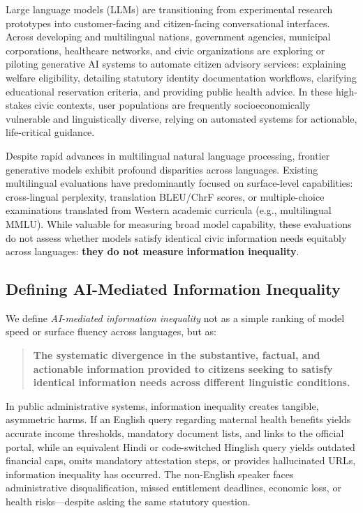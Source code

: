 \documentclass[11pt,a4paper]{article}
\begin{document}
Large language models (LLMs) are transitioning from experimental research prototypes into customer-facing and citizen-facing conversational interfaces. Across developing and multilingual nations, government agencies, municipal corporations, healthcare networks, and civic organizations are exploring or piloting generative AI systems to automate citizen advisory services: explaining welfare eligibility, detailing statutory identity documentation workflows, clarifying educational reservation criteria, and providing public health advice. In these high-stakes civic contexts, user populations are frequently socioeconomically vulnerable and linguistically diverse, relying on automated systems for actionable, life-critical guidance.

Despite rapid advances in multilingual natural language processing, frontier generative models exhibit profound disparities across languages. Existing multilingual evaluations have predominantly focused on surface-level capabilities: cross-lingual perplexity, translation BLEU/ChrF scores, or multiple-choice examinations translated from Western academic curricula (e.g., multilingual MMLU). While valuable for measuring broad model capability, these evaluations do not assess whether models satisfy identical civic information needs equitably across languages: \textbf{they do not measure information inequality}.

\subsection{Defining AI-Mediated Information Inequality}
\label{sec:defining_inequality}

We define \emph{AI-mediated information inequality} not as a simple ranking of model speed or surface fluency across languages, but as:
\begin{quote}
\textbf{The systematic divergence in the substantive, factual, and actionable information provided to citizens seeking to satisfy identical information needs across different linguistic conditions.}
\end{quote}

In public administrative systems, information inequality creates tangible, asymmetric harms. If an English query regarding maternal health benefits yields accurate income thresholds, mandatory document lists, and links to the official portal, while an equivalent Hindi or code-switched Hinglish query yields outdated financial caps, omits mandatory attestation steps, or provides hallucinated URLs, information inequality has occurred. The non-English speaker faces administrative disqualification, missed entitlement deadlines, economic loss, or health risks---despite asking the same statutory question.
\end{document}
